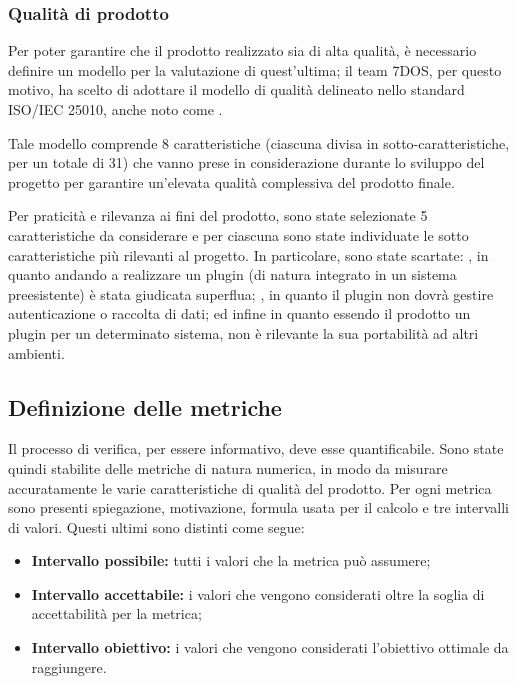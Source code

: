 \subsubsection{Qualità di prodotto}
Per poter garantire che il prodotto realizzato sia di alta qualità, è necessario definire un modello per la valutazione di quest'ultima; il team 7DOS, per questo motivo, ha scelto di adottare il modello di qualità delineato nello standard ISO/IEC 25010, anche noto come .

Tale modello comprende 8 caratteristiche (ciascuna divisa in sotto-caratteristiche, per un totale di 31) che vanno prese in considerazione durante lo sviluppo del progetto per garantire un'elevata qualità complessiva del prodotto finale.

Per praticità e rilevanza ai fini del prodotto, sono state selezionate 5 caratteristiche da considerare e per ciascuna sono state individuate le sotto caratteristiche più rilevanti al progetto. In particolare, sono state scartate: , in quanto andando a realizzare un plugin (di natura integrato in un sistema preesistente) è stata giudicata superflua; , in quanto il plugin non dovrà gestire autenticazione o raccolta di dati; ed infine  in quanto essendo il prodotto un plugin per un determinato sistema, non è rilevante la sua portabilità ad altri ambienti.

\subsection{Definizione delle metriche}
Il processo di verifica, per essere informativo, deve esse quantificabile. Sono state quindi stabilite delle metriche di natura numerica, in modo da misurare accuratamente le varie caratteristiche di qualità del prodotto. Per ogni metrica sono presenti  spiegazione, motivazione, formula usata per il calcolo e tre intervalli di valori. Questi ultimi sono distinti come segue:
\begin{itemize}
	\item {\textbf{Intervallo possibile:} tutti i valori che la metrica può assumere;}
	\item {\textbf{Intervallo accettabile:} i valori che vengono considerati oltre la soglia di accettabilità per la metrica;}
	\item {\textbf{Intervallo obiettivo:} i valori che vengono considerati l'obiettivo ottimale da raggiungere.}
\end{itemize}

